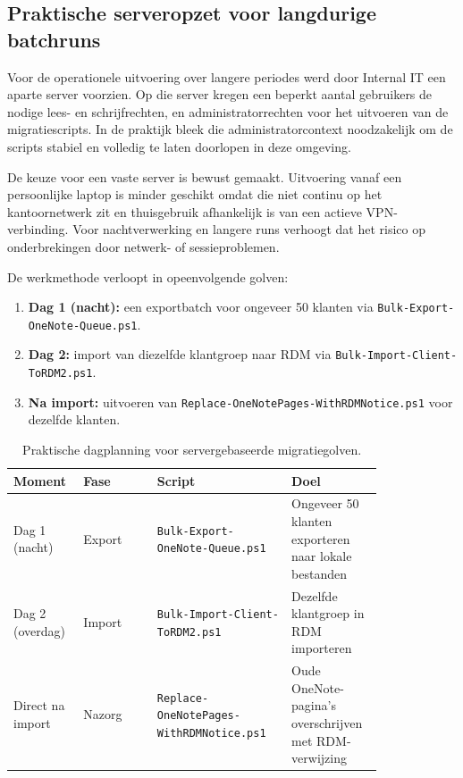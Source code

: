 \subsection{Praktische serveropzet voor langdurige batchruns}
\label{subsec:topic-server-setup-batchruns}

Voor de operationele uitvoering over langere periodes werd door Internal IT een aparte server voorzien. Op die server kregen een beperkt aantal gebruikers de nodige lees- en schrijfrechten, en administratorrechten voor het uitvoeren van de migratiescripts. In de praktijk bleek die administratorcontext noodzakelijk om de scripts stabiel en volledig te laten doorlopen in deze omgeving.

De keuze voor een vaste server is bewust gemaakt. Uitvoering vanaf een persoonlijke laptop is minder geschikt omdat die niet continu op het kantoornetwerk zit en thuisgebruik afhankelijk is van een actieve VPN-verbinding. Voor nachtverwerking en langere runs verhoogt dat het risico op onderbrekingen door netwerk- of sessieproblemen.

De werkmethode verloopt in opeenvolgende golven:

\begin{enumerate}
    \item \textbf{Dag 1 (nacht):} een exportbatch voor ongeveer 50 klanten via \texttt{Bulk-Export-OneNote-Queue.ps1}.
    \item \textbf{Dag 2:} import van diezelfde klantgroep naar RDM via \texttt{Bulk-Import-Client-ToRDM2.ps1}.
    \item \textbf{Na import:} uitvoeren van \texttt{Replace-OneNotePages-WithRDMNotice.ps1} voor dezelfde klanten.
\end{enumerate}

\begin{table}[htbp]
\centering
\caption[Operationele dagplanning migratiebatch]{Praktische dagplanning voor servergebaseerde migratiegolven.}
\label{tab:server-batch-dagplanning}
\renewcommand{\arraystretch}{1.2}
\begin{tabular}{|p{0.12\linewidth}|p{0.18\linewidth}|p{0.32\linewidth}|p{0.20\linewidth}|}
\hline
\textbf{Moment} & \textbf{Fase} & \textbf{Script} & \textbf{Doel} \\
\hline
Dag 1 (nacht) & Export & \texttt{Bulk-Export-OneNote-Queue.ps1} & Ongeveer 50 klanten exporteren naar lokale bestanden \\
\hline
Dag 2 (overdag) & Import & \texttt{Bulk-Import-Client-ToRDM2.ps1} & Dezelfde klantgroep in RDM importeren \\
\hline
Direct na import & Nazorg & \texttt{Replace-OneNotePages-\allowbreak WithRDMNotice.ps1} & Oude OneNote-pagina's overschrijven met RDM-verwijzing \\
\hline
\end{tabular}
\end{table}

